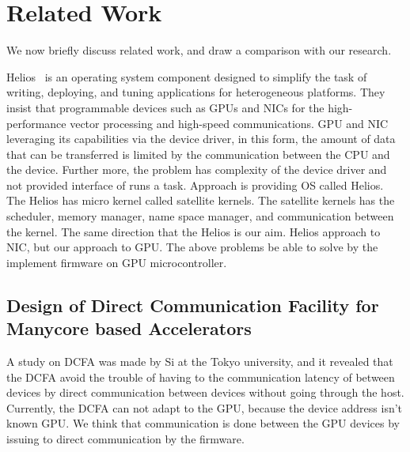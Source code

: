 
\section{Related Work}\label{sec:related}

We now briefly discuss related work, and draw a comparison with our
research. 

Helios~\cite{NightingaleEB:SOSP09:2009} is an operating system component
designed to simplify the task of writing, deploying, and tuning
applications for heterogeneous platforms.
They insist that programmable devices such as GPUs and NICs for the high-performance vector processing and high-speed communications.
GPU and NIC leveraging its capabilities via the device driver, in this form, the amount of data that can be transferred is limited by the communication between the CPU and the device.
Further more, the problem has complexity of the device driver and not provided interface of runs a task.
Approach is providing OS called Helios.
The Helios has micro kernel called satellite kernels.
The satellite kernels has the scheduler, memory manager, name space manager, and communication between the kernel.
The same direction that the Helios is our aim.
Helios approach to NIC, but our approach to GPU.
The above problems be able to solve by the  implement firmware on GPU microcontroller.

\subsection{Design of Direct Communication Facility for Manycore based Accelerators}
A study on DCFA\cite{weko_81351_1} was made by Si at the Tokyo university, and it revealed that the DCFA avoid the trouble of having to the communication latency of between devices by direct communication between devices without going through the host.
Currently, the DCFA can not adapt to the GPU, because the device address isn't known GPU.
We think that communication is done between the GPU devices by issuing to direct communication by the firmware.

